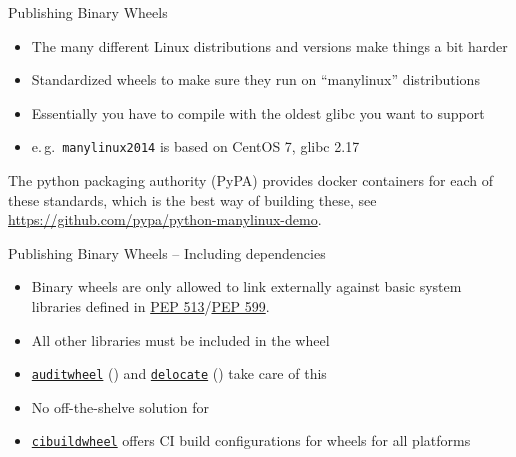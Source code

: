 \begin{frame}[c]{Publishing Binary Wheels}
  \begin{itemize}
    \item The many different Linux distributions and versions make things a bit harder
    \item Standardized wheels to make sure they run on \enquote{manylinux} distributions
    \item Essentially you have to compile with the oldest glibc you want to support
    \item e.\,g.\ \texttt{manylinux2014} is based on CentOS 7, glibc 2.17
  \end{itemize}

  The python packaging authority (PyPA) provides docker containers for each of these standards,
  which is the best way of building these, see \url{https://github.com/pypa/python-manylinux-demo}.
\end{frame}

\begin{frame}[c, fragile]{Publishing Binary Wheels – Including dependencies}
  \begin{itemize}
    \item Binary wheels are only allowed to link externally against basic system libraries defined in \href{https://www.python.org/dev/peps/pep-0513/}{PEP 513}/\href{https://www.python.org/dev/peps/pep-0599/}{PEP 599}.
    \item All other libraries must be included in the wheel
    \item \href{https://github.com/pypa/auditwheel}{\texttt{auditwheel}} () and \href{https://github.com/matthew-brett/delocate}{\texttt{delocate}} () take care of this
    \item No off-the-shelve solution for 
    \item \href{https://github.com/pypa/cibuildwheel}{\texttt{cibuildwheel}} offers CI build configurations for wheels for all platforms
  \end{itemize}

\end{frame}


